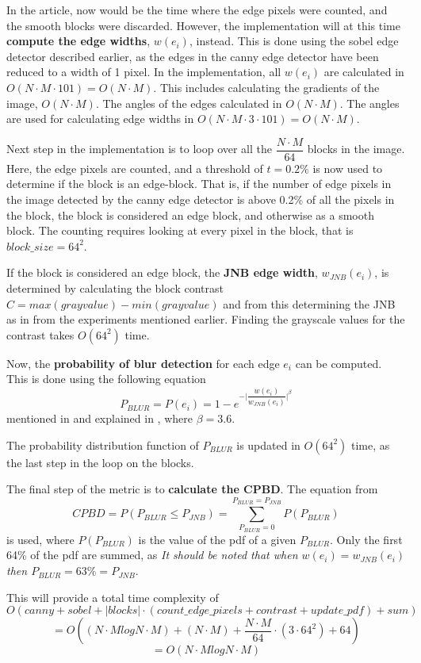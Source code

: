 In the article\cite{CPBD}, now would be the time where the edge pixels were counted, and the smooth blocks were discarded. However, the implementation\cite{code_CPBD} will at this time \textbf{compute the edge widths}, $w(e_i)$, instead. This is done using the sobel edge detector\cite{code_CPBD} described earlier, as the edges in the canny edge detector have been reduced to a width of 1 pixel. In the implementation, all $w(e_i)$ are calculated in $O(N\cdot M\cdot 101)=O(N\cdot M)$. This includes calculating the gradients of the image, $O(N\cdot M)$. The angles of the edges calculated in $O(N\cdot M)$. The angles are used for calculating edge widths in $O(N\cdot M\cdot 3\cdot 101)=O(N\cdot M)$.

Next step in the implementation is to loop over all the $\dfrac{N\cdot M}{64}$ blocks in the image. Here, the edge pixels are counted, and a threshold of $t=0.2\%$ is now used to determine if the block is an edge-block. That is, if the number of edge pixels in the image detected by the canny edge detector is above 0.2\% of all the pixels in the block, the block is considered an edge block, and otherwise as a smooth block. The counting requires looking at every pixel in the block, that is $block\_size=64^2$.

If the block is considered an edge block, the \textbf{JNB edge width}, $w_{JNB}(e_i)$, is determined by calculating the block contrast $C=max(grayvalue)-min(grayvalue)$ and from this determining the JNB as in \cite{JNB} from the experiments mentioned earlier. Finding the grayscale values for the contrast takes $O(64^2)$ time.

Now, the \textbf{probability of blur detection} for each edge $e_i$ can be computed. This is done using the following equation 
$$P_{BLUR}=P(e_i)=1-e^{-\lvert\dfrac{w(e_i)}{w_{JNB}(e_i)}|^\beta}$$
mentioned in \cite{CPBD} and explained in \cite{JNB}, where $\beta = 3.6$.

The probability distribution function of $P_{BLUR}$ is updated in $O(64^2)$ time, as the last step in the loop on the blocks.

The final step of the metric is to \textbf{calculate the CPBD}. The equation from \cite{CPBD}
$$CPBD = P(P_{BLUR} \leq P_{JNB}) = \sum_{P_{BLUR}=0}^{P_{BLUR}=P_{JNB}} P(P_{BLUR})$$
is used, where $P(P_{BLUR})$ is the value of the pdf of a given $P_{BLUR}$. Only the first 64\% of the pdf are summed, as \textit{It should be noted that when $w(e_i) = w_{JNB}(e_i)$ then $P_{BLUR} = 63\% = P_{JNB}$}.\cite{CPBD}

This will provide a total time complexity of 
$$O(canny + sobel + |blocks| \cdot (count\_edge\_pixels + contrast + update\_pdf) + sum)$$
$$= O((N\cdot M log N\cdot M) + (N\cdot M) + \dfrac{N\cdot M}{64} \cdot (3\cdot 64^2) + 64)$$
$$= O(N\cdot M log N\cdot M)$$


